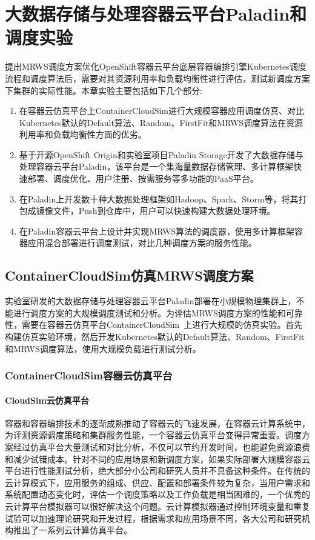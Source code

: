 \chapter{大数据存储与处理容器云平台Paladin和调度实验}
提出MRWS调度方案优化OpenShift容器云平台底层容器编排引擎Kubernetes调度流程和调度算法后，需要对其资源利用率和负载均衡性进行评估，测试新调度方案下集群的实际性能。本章实验主要包括如下几个部分:
\begin{enumerate}[(1)]
	\item 在容器云仿真平台上ContainerCloudSim进行大规模容器应用调度仿真、对比Kubernetes默认的Default算法、Random、FirstFit和MRWS调度算法在资源利用率和负载均衡性方面的优劣。
	\item 基于开源OpenShift Origin和实验室项目Paladin Storage开发了大数据存储与处理容器云平台Paladin，该平台是一个集海量数据存储管理、多计算框架快速部署、调度优化、用户注册、按需服务等多功能的PaaS平台。
	\item 在Paladin上开发数十种大数据处理框架如Hadoop、Spark、Storm等，将其打包成镜像文件，Push到仓库中，用户可以快速构建大数据处理环境。
	\item 在Paladin容器云平台上设计并实现MRWS算法的调度器，使用多计算框架容器应用混合部署进行调度测试，对比几种调度方案的服务性能。
\end{enumerate}

\section{ContainerCloudSim仿真MRWS调度方案}
实验室研发的大数据存储与处理容器云平台Paladin部署在小规模物理集群上，不能进行调度方案的大规模调度测试和分析。为评估MRWS调度方案的性能和可靠性，需要在容器云仿真平台ContainerCloudSim~\cite{Piraghaj2016ContainerCloudSim}上进行大规模的仿真实验。首先构建仿真实验环境，然后开发Kubernetes默认的Default算法、Random、FirstFit和MRWS调度算法，使用大规模负载进行测试分析。

\subsection{ContainerCloudSim容器云仿真平台}
\subsubsection{CloudSim云仿真平台}
容器和容器编排技术的逐渐成熟推动了容器云的飞速发展，在容器云计算系统中，为评测资源调度策略和集群服务性能，一个容器云仿真平台变得异常重要。调度方案经过仿真平台大量测试和对比分析，不仅可以节约开发时间，也能避免资源浪费和减少试错成本。针对不同的应用场景和新调度方案，如果实际部署大规模容器云平台进行性能测试分析，绝大部分小公司和研究人员并不具备这种条件。在传统的云计算模式下，应用服务的组成、供应、配置和部署条件较为复杂，当用户需求和系统配置动态变化时，评估一个调度策略以及工作负载是相当困难的，一个优秀的云计算平台模拟器可以很好解决这个问题。云计算模拟器通过控制环境变量和重复试验可以加速理论研究和开发过程，根据需求和应用场景不同，各大公司和研究机构推出了一系列云计算仿真平台。


